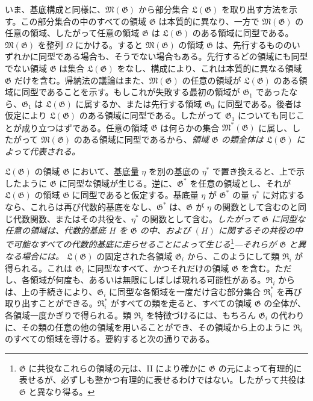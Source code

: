 いま、基底構成と同様に、$\mathfrak M(\mathfrak G)$ から部分集合 $\mathfrak L(\mathfrak G)$ を取り出す方法を示す。この部分集合の中のすべての領域 $\mathfrak G$ は本質的に異なり、一方で $\mathfrak M(\mathfrak G)$ の任意の領域、したがって任意の領域 $\mathfrak G$ は $\mathfrak L(\mathfrak G)$ のある領域に同型である。$\mathfrak M(\mathfrak G)$ を整列 $\Omega$ にかける。すると $\mathfrak M(\mathfrak G)$ の領域 $\mathfrak G$ は、先行するもののいずれかに同型である場合も、そうでない場合もある。先行するどの領域にも同型でない領域 $\mathfrak G$ は集合 $\mathfrak L(\mathfrak G)$ をなし、構成により、これは本質的に異なる領域 $\mathfrak G$ だけを含む。帰納法の議論はまた、$\mathfrak M(\mathfrak G)$ の任意の領域が $\mathfrak L(\mathfrak G)$ のある領域に同型であることを示す。もしこれが失敗する最初の領域が $\mathfrak G_1$ であったなら、$\mathfrak G_1$ は $\mathfrak L(\mathfrak G)$ に属するか、または先行する領域 $\mathfrak G_0$ に同型である。後者は仮定により $\mathfrak L(\mathfrak G)$ のある領域に同型である。したがって $\mathfrak G_1$ についても同じことが成り立つはずである。任意の領域 $\mathfrak G$ は何らかの集合 $\mathfrak M^*(\mathfrak G)$ に属し、したがって $\mathfrak M(\mathfrak G)$ のある領域に同型であるから、\emph{領域 $\mathfrak G$ の類全体は $\mathfrak L(\mathfrak G)$ によって代表される。}

$\mathfrak L(\mathfrak G)$ の領域 $\mathfrak G$ において、基底量 $\eta$ を別の基底の $\eta^*$ で置き換えると、上で示したように $\mathfrak G$ に同型な領域が生じる。逆に、$\mathfrak G^*$ を任意の領域とし、それが $\mathfrak L(\mathfrak G)$ の領域 $\mathfrak G$ に同型であると仮定する。基底量 $\eta$ が $\mathfrak G^*$ の量 $\eta^*$ に対応するなら、これらは再び代数的基底をなし、$\mathfrak G^*$ は、$\mathfrak G$ が $\eta$ の関数として含むのと同じ代数関数、またはその共役を、$\eta^*$ の関数として含む。\emph{したがって $\mathfrak G$ に同型な任意の領域は、代数的基底 $H$ を $\mathfrak G$ の中、および $(H)$ に関するその共役の中で可能なすべての代数的基底に走らせることによって生じる}\footnote{$\mathfrak G$ に共役なこれらの領域の元は、II により確かに $\mathfrak G$ の元によって有理的に表せるが、必ずしも整かつ有理的に表せるわけではない。したがって共役は $\mathfrak G$ と異なり得る。}\emph{---それらが $\mathfrak G$ と異なる場合には。} $\mathfrak L(\mathfrak G)$ の固定された各領域 $\mathfrak G_i$ から、このようにして類 $\mathfrak R_i$ が得られる。これは $\mathfrak G_i$ に同型なすべて、かつそれだけの領域 $\mathfrak G$ を含む。ただし、各領域が何度も、あるいは無限にしばしば現れる可能性がある。$\mathfrak R_i$ からは、上の手続きにより、$\mathfrak G_i$ に同型な各領域を一度だけ含む部分集合 $\mathfrak R_i^*$ を再び取り出すことができる。$\mathfrak R_i^*$ がすべての類を走ると、すべての領域 $\mathfrak G$ の全体が、各領域一度かぎりで得られる。類 $\mathfrak R_i$ を特徴づけるには、もちろん $\mathfrak G_i$ の代わりに、その類の任意の他の領域を用いることができ、その領域から上のように $\mathfrak R_i$ のすべての領域を導ける。要約すると次の通りである。

